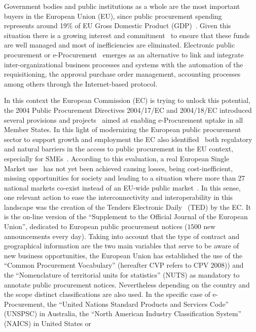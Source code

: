 Government bodies and public institutions as a whole are the most important buyers in the European Union (EU), since public procurement spending represents around 19\% of 
EU Gross Domestic Product (GDP)~\cite{d2010}. Given this situation there is a growing interest and commitment~\cite{d2010a} to ensure that these funds are 
well managed and most of inefficiencies are eliminated. Electronic public procurement or e-Procurement~\cite{Podlogar2007} emerges as an alternative to link and 
integrate inter-organizational business processes and systems with the automation of the requisitioning, the approval purchase order 
management, accounting processes among others through the Internet-based protocol. 

In this context the European Commission (EC) is trying to unlock this potential, the 2004 Public Procurement Directives 2004/17/EC and 2004/18/EC 
introduced several provisions and projects~\cite{peppol,e-certis} aimed at enabling e-Procurement uptake in all Member States. In this light of 
modernizing the European public procurement sector to support growth and employment the EC also identified~\cite{siemensEval} 
both regulatory and natural barriers in the access to public procurement in the EU context, especially for SMEs~\cite{d2008}. 
According to this evaluation, a real European Single Market use~\cite{d2011} has not yet been achieved causing losses, 
being cost-inefficient, missing opportunities for society and leading to a situation where more than 27 national markets 
co-exist instead of an EU-wide public market~\cite{monti2010}. In this sense, one relevant action to ease the interconnectivity and interoperability in this landscape was the creation of the Tenders Electronic Daily~\cite{eNotices,formsTed} (TED) 
by the EC. It is the on-line version of the ``Supplement to the Official Journal of the European Union'', dedicated to European public procurement notices 
($1500$ new announcements every day). Taking into account that the type of contract and geographical information are the two main variables 
that serve to be aware of new business opportunities, the European Union has established the use of the ``Common Procurement Vocabulary'' (hereafter CVP refers to CPV 2008)) 
and the ``Nomenclature of territorial units for statistics'' (NUTS) as mandatory to annotate public procurement notices. Nevertheless depending on the country and the scope distinct classifications are also used. 
In the specific case of e-Procurement, the ``United Nations Standard Products and Services Code'' (UNSPSC) in Australia, the ``North American Industry Classification System'' (NAICS) in United States or 
